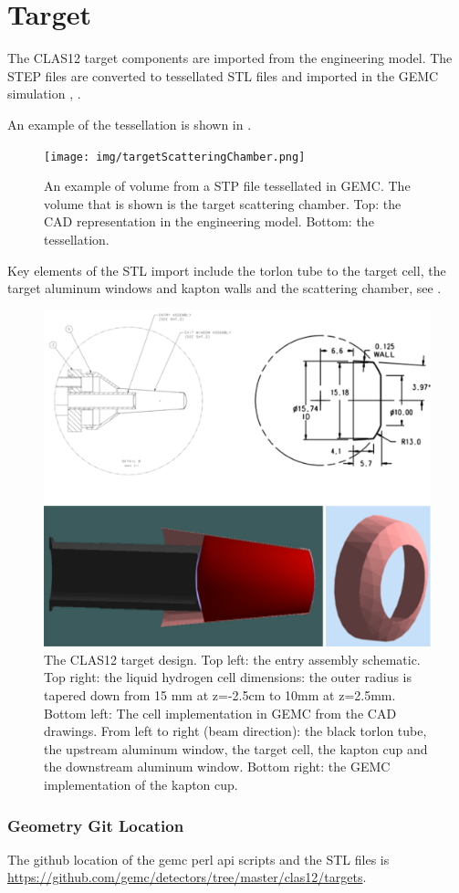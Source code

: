 \section{Target}

The CLAS12 target components are imported from the engineering model. The STEP files are converted to tessellated STL files and imported
in the GEMC simulation \cite{targetCorrection}, \cite{targetStudy}.

An example of the tessellation is shown in .

\begin{figure}
	\centering
	\texttt{[image: img/targetScatteringChamber.png]}
	\caption{An example of volume from a STP file tessellated in GEMC. The volume that is shown is the target scattering chamber.
            Top: the CAD representation in the engineering model. Bottom: the tessellation. }
	\label{fig:targetScatteringChamber}
\end{figure}

Key elements of the STL import include the torlon tube to the target cell,
the target aluminum windows and kapton walls and the scattering chamber, see .

\begin{figure}
	\centering
	\includegraphics[width=0.95\columnwidth,keepaspectratio]{img/targetDesign.png}
	\caption{The CLAS12 target design. Top left: the entry assembly schematic. Top right: the liquid hydrogen cell
            dimensions: the outer radius is tapered down from 15 mm at z=-2.5cm to 10mm at z=2.5mm.
            Bottom left: The cell implementation in GEMC from the CAD drawings. From left to right (beam direction):
            the black torlon tube, the upstream aluminum window, the target cell, the kapton cup and the
				downstream aluminum window. Bottom right: the GEMC implementation of the kapton cup.}
	\label{fig:targetDesign}
\end{figure}


\subsubsection{Geometry Git Location}
The github location of the gemc perl api scripts and the STL files is \url{https://github.com/gemc/detectors/tree/master/clas12/targets}.






